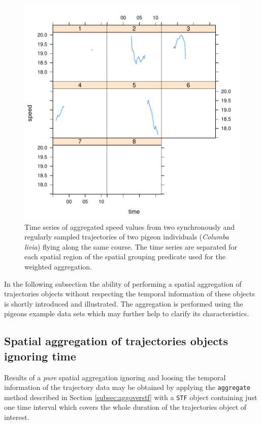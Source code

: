 \documentclass[12pt, oneside, a4paper]{scrbook}
\newcommand{\pkg}[1]{{\normalfont\fontseries{b}\selectfont #1}}
\let\code=\texttt
\begin{document}
\begin{figure}[!htb]
\centering
\includegraphics{trajagg-agg_sp_pigeon_TrColl_fig_1}
\caption[Time series of aggregated speed values from two pigeons separated by spatial geometries.]{Time series of aggregated speed values from two synchronously and regularly sampled trajectories of two pigeon individuals (\textit{Columba livia}) flying along the same course. The time series are separated for each spatial region of the spatial grouping predicate used for the weighted aggregation.}
\label{fig:aggpigeonsoversp}
\end{figure}


In the following subsection the ability of performing a spatial aggregation of \pkg{trajectories} objects without respecting the temporal information of these objects is shortly introduced and illustrated. The aggregation is performed using the pigeons example data sets which may further help to clarify its characteristics.


\subsection{Spatial aggregation of \pkg{trajectories} objects ignoring time}
\label{subsec:aggregationbyspigntime}

Results of a \textit{pure} spatial aggregation ignoring and loosing the temporal information of the trajectory data may be obtained by applying the \code{aggregate} method described in Section \ref{subsec:aggoverstf} with a \code{STF} object containing just one time interval which covers the whole duration of the \pkg{trajectories} object of interest.
\par\medskip
\end{document}
